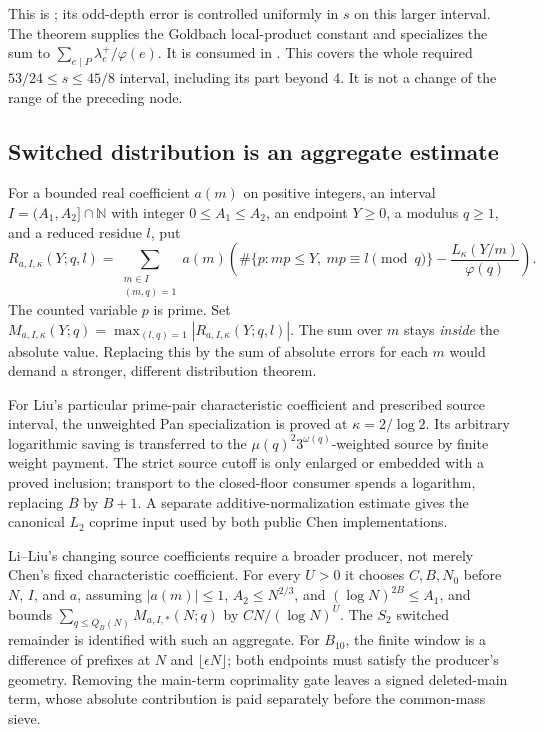 \begin{enumerate}
This is ;
its odd-depth error is controlled uniformly in $s$ on this larger interval.
The theorem 
supplies the Goldbach local-product constant and specializes the sum to
$\sum_{e\mid P}\lambda_e^+/\varphi(e)$.
It is consumed in
.
This covers the whole required $53/24\le s\le45/8$ interval, including
its part beyond $4$. It is not a change of the range of the preceding node.
\end{enumerate}

\subsection{Switched distribution is an aggregate estimate}

For a bounded real coefficient $a(m)$ on positive integers, an interval
$I=(A_1,A_2]\cap\mathbb N$ with integer $0\le A_1\le A_2$, an endpoint
$Y\ge0$, a modulus $q\ge1$, and a reduced residue $l$, put
\[
 R_{a,I,\kappa}(Y;q,l)=
 \sum_{\substack{m\in I\\(m,q)=1}}a(m)
 \left(\#\{p:mp\le Y,\ mp\equiv l\pmod q\}
       -\frac{L_\kappa(Y/m)}{\varphi(q)}\right).
\]
The counted variable $p$ is prime. Set
$M_{a,I,\kappa}(Y;q)=\max_{(l,q)=1}|R_{a,I,\kappa}(Y;q,l)|$.
The sum over $m$ stays \emph{inside} the absolute value.
Replacing this by the sum of absolute errors for each $m$ would demand a
stronger, different distribution theorem.

For Liu's particular prime-pair characteristic coefficient and prescribed
source interval, the unweighted Pan specialization is proved at $\kappa=2/\log2$.
Its arbitrary logarithmic saving is transferred to the
$\mu(q)^2 3^{\omega(q)}$-weighted source by finite weight payment.
The strict source cutoff is only enlarged or embedded with a proved inclusion;
transport to the closed-floor consumer spends a logarithm, replacing $B$ by $B+1$.
A separate additive-normalization estimate gives the canonical $L_2$ coprime
input used by both public Chen implementations.

Li--Liu's changing source coefficients require a broader producer, not merely
Chen's fixed characteristic coefficient.
For every $U>0$ it chooses $C,B,N_0$ before $N$, $I$, and $a$,
assuming $|a(m)|\le1$, $A_2\le N^{2/3}$, and $(\log N)^{2B}\le A_1$,
and bounds $\sum_{q\le Q_B(N)}M_{a,I,*}(N;q)$ by $CN/(\log N)^U$.
The $S_2$ switched remainder is identified with such an aggregate.
For $B_{10}$, the finite window is a difference of prefixes at $N$ and
$\lfloor\epsilon N\rfloor$; both endpoints must satisfy the producer's geometry.
Removing the main-term coprimality gate leaves a signed deleted-main term,
whose absolute contribution is paid separately before the common-mass sieve.

